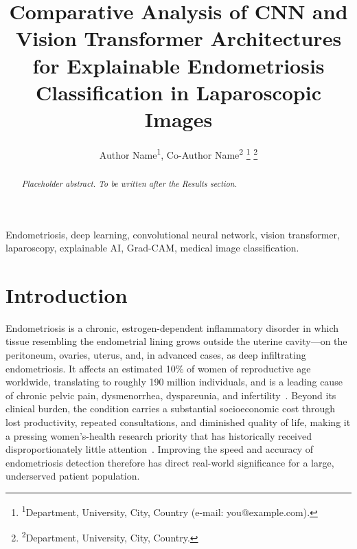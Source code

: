 \documentclass[journal]{IEEEtran}
\begin{document}
\title{Comparative Analysis of CNN and Vision Transformer Architectures for Explainable Endometriosis Classification in Laparoscopic Images}

\author{
  Author Name\textsuperscript{1},
  Co-Author Name\textsuperscript{2}
  \thanks{\textsuperscript{1}Department, University, City, Country (e-mail: you@example.com).}
  \thanks{\textsuperscript{2}Department, University, City, Country.}
}

\maketitle

\begin{abstract}
\textit{Placeholder abstract. To be written after the Results section.}
\end{abstract}

\begin{IEEEkeywords}
Endometriosis, deep learning, convolutional neural network, vision transformer,
laparoscopy, explainable AI, Grad-CAM, medical image classification.
\end{IEEEkeywords}

\section{Introduction}

Endometriosis is a chronic, estrogen-dependent inflammatory disorder in which tissue resembling
the endometrial lining grows outside the uterine cavity---on the peritoneum, ovaries, uterus, and,
in advanced cases, as deep infiltrating endometriosis. It affects an estimated 10\% of women of
reproductive age worldwide, translating to roughly 190 million individuals, and is a leading cause
of chronic pelvic pain, dysmenorrhea, dyspareunia, and infertility~\cite{ref_e1,ref_e3}. Beyond
its clinical burden, the condition carries a substantial socioeconomic cost through lost
productivity, repeated consultations, and diminished quality of life, making it a pressing
women's-health research priority that has historically received disproportionately little
attention~\cite{ref_e3,ref_d1}. Improving the speed and accuracy of endometriosis detection
therefore has direct real-world significance for a large, underserved patient population.
\end{document}
